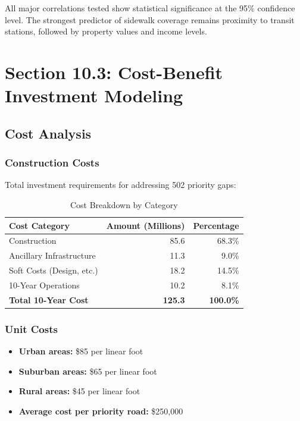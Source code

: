 \documentclass[11pt,letterpaper]{report}
\begin{document}
All major correlations tested show statistical significance at the 95\% confidence level. The strongest predictor of sidewalk coverage remains proximity to transit stations, followed by property values and income levels.

\chapter{Section 10.3: Cost-Benefit Investment Modeling}

\section{Cost Analysis}

\subsection{Construction Costs}
Total investment requirements for addressing 502 priority gaps:

\begin{table}[h]
\centering
\caption{Cost Breakdown by Category}
\begin{tabular}{lrr}
\toprule
\textbf{Cost Category} & \textbf{Amount (Millions)} & \textbf{Percentage} \\
\midrule
Construction & 85.6 & 68.3\% \\
Ancillary Infrastructure & 11.3 & 9.0\% \\
Soft Costs (Design, etc.) & 18.2 & 14.5\% \\
10-Year Operations & 10.2 & 8.1\% \\
\textbf{Total 10-Year Cost} & \textbf{125.3} & \textbf{100.0\%} \\
\bottomrule
\end{tabular}
\end{table}

\subsection{Unit Costs}
\begin{itemize}
    \item \textbf{Urban areas:} \$85 per linear foot
    \item \textbf{Suburban areas:} \$65 per linear foot
    \item \textbf{Rural areas:} \$45 per linear foot
    \item \textbf{Average cost per priority road:} \$250,000
\end{itemize}
\end{document}

